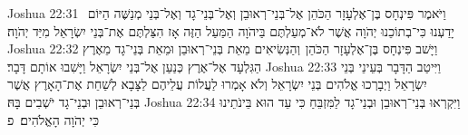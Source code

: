 Joshua 22:31	וַיֹּאמֶר פִּינְחָס בֶּן־אֶלְעָזָר הַכֹּהֵן אֶל־בְּנֵי־רְאוּבֵן וְאֶל־בְּנֵי־גָד וְאֶל־בְּנֵי מְנַשֶּׁה הַיּוֹם  יָדַעְנוּ כִּי־בְתוֹכֵנוּ יְהֹוָה אֲשֶׁר לֹא־מְעַלְתֶּם בַּיהֹוָה הַמַּעַל הַזֶּה אָז הִצַּלְתֶּם אֶת־בְּנֵי יִשְׂרָאֵל מִיַּד יְהֹוָה׃
Joshua 22:32	וַיָּשׁב פִּינְחָס בֶּן־אֶלְעָזָר הַכֹּהֵן  וְהַנְּשִׂיאִים מֵאֵת בְּנֵי־רְאוּבֵן וּמֵאֵת בְּנֵי־גָד מֵאֶרֶץ הַגִּלְעָד אֶל־אֶרֶץ כְּנַעַן אֶל־בְּנֵי יִשְׂרָאֵל וַיָּשִׁבוּ אוֹתָם דָּבָר׃
Joshua 22:33	וַיִּיטַב הַדָּבָר בְּעֵינֵי בְּנֵי יִשְׂרָאֵל וַיְבָרְכוּ אֱלֹהִים בְּנֵי יִשְׂרָאֵל וְלֹא אָמְרוּ לַעֲלוֹת עֲלֵיהֶם לַצָּבָא לְשַׁחֵת אֶת־הָאָרֶץ אֲשֶׁר בְּנֵי־רְאוּבֵן וּבְנֵי־גָד יֹשְׁבִים בָּהּ׃
Joshua 22:34	וַיִּקְרְאוּ בְּנֵי־רְאוּבֵן וּבְנֵי־גָד לַמִּזְבֵּחַ כִּי עֵד הוּא בֵּינֹתֵינוּ כִּי יְהֹוָה הָאֱלֹהִים׃ {פ}
